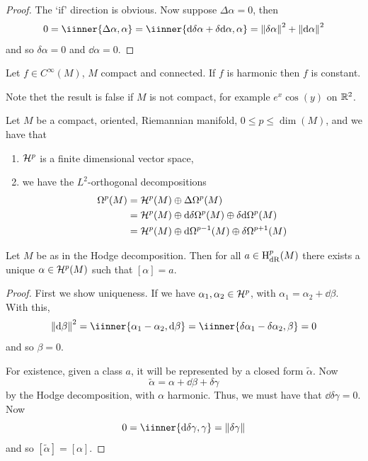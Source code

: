 \documentclass{article}
\begin{document}
\begin{proof}
    The `if' direction is obvious. Now suppose \(\Delta\alpha = 0\), then
    \begin{align*}
        0 = \iinner{\Delta\alpha, \alpha} = \iinner{\dd\delta\alpha + \delta \dd \alpha, \alpha} = \norm{\delta\alpha}^2 + \norm{\dd\alpha}^2
    \end{align*}
    and so \(\delta\alpha = 0\) and \(\dd\alpha = 0\).
\end{proof}

\begin{corollary}
    Let \(f \in C^\infty(M)\), \(M\) compact and connected. If \(f\) is harmonic then \(f\) is constant. 
\end{corollary}

Note thet the result is false if \(M\) is not compact, for example \(e^x\cos(y)\) on \(\mathbb{R}^2\).

\begin{theorem}
    Let \(M\) be a compact, oriented, Riemannian manifold, \(0 \le p \le \dim(M)\), and we have that
    \begin{enumerate}
        \item \(\mathcal{H}^p\) is a finite dimensional vector space,
        \item we have the \(L^2\)-orthogonal decompositions
        \begin{align*}
            \Omega^p(M) &= \mathcal{H}^p(M) \oplus \Delta \Omega^p(M) \\
            &= \mathcal{H}^p(M) \oplus \dd\delta \Omega^p(M) \oplus \delta\dd \Omega^p(M) \\
            &= \mathcal{H}^p(M) \oplus \dd\Omega^{p-1}(M) \oplus \delta\Omega^{p+1}(M)
        \end{align*}
    \end{enumerate}
\end{theorem}

\begin{corollary}
    Let \(M\) be as in the Hodge decomposition. Then for all \(a \in \mathrm{H}_\mathrm{dR}^p(M)\) there exists a unique \(\alpha \in \mathcal{H}^p(M)\) such that \([\alpha] = a\).
\end{corollary}

\begin{proof}
    First we show uniqueness. If we have \(\alpha_1, \alpha_2 \in \mathcal{H}^p\), with \(\alpha_1 = \alpha_2 + \dd \beta\). With this,
    \[\norm{\dd\beta}^2 = \iinner{\alpha_1 - \alpha_2, \dd\beta} = \iinner{\delta\alpha_1 - \delta\alpha_2, \beta} = 0\]
    and so \(\beta = 0\).

    For existence, given a class \(a\), it will be represented by a closed form \(\widetilde\alpha\). Now
    \[\widetilde\alpha = \alpha + \dd\beta + \delta\gamma\]
    by the Hodge decomposition, with \(\alpha\) harmonic. Thus, we must have that \(\dd\delta\gamma = 0\). Now
    \[0 = \iinner{\dd\delta\gamma, \gamma} = \norm{\delta\gamma}\]
    and so \([\widetilde \alpha] = [\alpha]\).
\end{proof}
\end{document}
